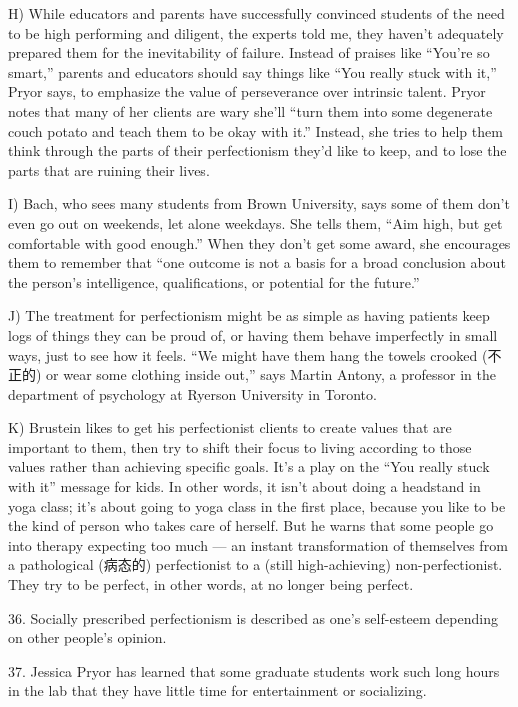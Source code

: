 \documentclass[UTF8,11pt]{ctexart}
\begin{document}
H) While educators and parents have successfully convinced students of the need to be high performing and diligent, the experts told me, they haven’t adequately prepared them for the inevitability of failure. Instead of praises like “You’re so smart,” parents and educators should say things like “You really stuck with it,” Pryor says, to emphasize the value of perseverance over intrinsic talent. Pryor notes that many of her clients are wary she’ll “turn them into some degenerate couch potato and teach them to be okay with it.” Instead, she tries to help them think through the parts of their perfectionism they’d like to keep, and to lose the parts that are ruining their lives.


I) Bach, who sees many students from Brown University, says some of them don’t even go out on weekends, let alone weekdays. She tells them, “Aim high, but get comfortable with good enough.” When they don’t get some award, she encourages them to remember that “one outcome is not a basis for a broad conclusion about the person’s intelligence, qualifications, or potential for the future.”


J) The treatment for perfectionism might be as simple as having patients keep logs of things they can be proud of, or having them behave imperfectly in small ways, just to see how it feels. “We might have them hang the towels crooked (不正的) or wear some clothing inside out,” says Martin Antony, a professor in the department of psychology at Ryerson University in Toronto.


K) Brustein likes to get his perfectionist clients to create values that are important to them, then try to shift their focus to living according to those values rather than achieving specific goals. It’s a play on the “You really stuck with it” message for kids. In other words, it isn’t about doing a headstand in yoga class; it’s about going to yoga class in the first place, because you like to be the kind of person who takes care of herself. But he warns that some people go into therapy expecting too much — an instant transformation of themselves from a pathological (病态的) perfectionist to a (still high-achieving) non-perfectionist. They try to be perfect, in other words, at no longer being perfect.


36. Socially prescribed perfectionism is described as one’s self-esteem depending on other people’s opinion.


37. Jessica Pryor has learned that some graduate students work such long hours in the lab that they have little time for entertainment or socializing.
\end{document}

